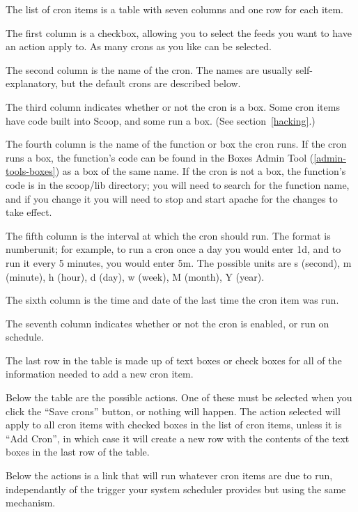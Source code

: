 The list of cron items is a table with seven columns and one row for each item.

The first column is a checkbox, allowing you to select the feeds you want to have an action apply to.  As many crons as you like can be selected.

The second column is the name of the cron.  The names are usually self-explanatory, but the default crons are described below.

The third column indicates whether or not the cron is a box.  Some cron items have code built into Scoop, and some run a box.  (See section~\ref{hacking}.)

The fourth column is the name of the function or box the cron runs.  If the cron runs a box, the function's code can be found in the Boxes Admin Tool (\ref{admin-tools-boxes}) as a box of the same name. If the cron is not a box, the function's code is in the scoop/lib directory; you will need to search for the function name, and if you change it you will need to stop and start apache for the changes to take effect.

The fifth column is the interval at which the cron should run.  The format is \latexhtml{$<$}{<}number\latexhtml{$>$}{>}\latexhtml{$<$}{<}unit\latexhtml{$>$}{>}; for example, to run a cron once a day you would enter 1d, and to run it every 5 minutes, you would enter 5m.  The possible units are s (second), m (minute), h (hour), d (day), w (week), M (month), Y (year).

The sixth column is the time and date of the last time the cron item was run.

The seventh column indicates whether or not the cron is enabled, or run on schedule.

The last row in the table is made up of text boxes or check boxes for all of the information needed to add a new cron item.

Below the table are the possible actions.  One of these must be selected when you click the ``Save crons'' button, or nothing will happen.  The action selected will apply to all cron items with checked boxes in the list of cron items, unless it is ``Add Cron'', in which case it will create a new row with the contents of the text boxes in the last row of the table.

Below the actions is a link that will run whatever cron items are due to run, independantly of the trigger your system scheduler provides but using the same mechanism.

